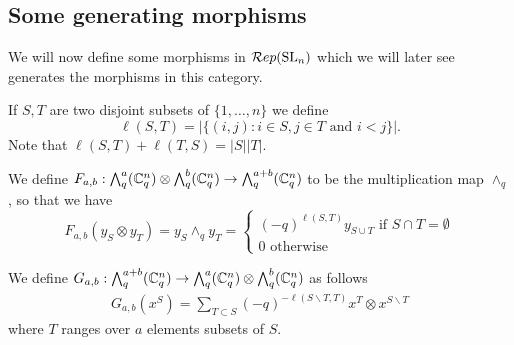 \documentclass[11pt,leqno]{article}
\begin{document}
\subsection{Some generating morphisms}
\label{sec:generating-morphisms}
We will now define some morphisms in $ \mathcal{R}ep({\rm{SL}}_n) $ which we will later see generates the morphisms in this category.

If $ S, T $ are two disjoint subsets of $ \{1, \dots, n\} $ we define $$ \ell(S, T) = |\{ (i,j) : i \in S, j \in T \text{ and } i < j \}|. $$ Note that $\ell(S,T) + \ell(T,S) = |S||T| $.

We define $ F_{a,b} : \bigwedge^a_q ({\mathbb{C}}^n_q) \otimes \bigwedge^b_q({\mathbb{C}}^n_q) \rightarrow \bigwedge^{a+b}_q({\mathbb{C}}^n_q) $ to be the 
multiplication map $ \wedge_q $, so that we have
\begin{equation*}
F_{a,b}(y_S \otimes y_T) = y_S \wedge_q y_T = \begin{cases} (-q)^{\ell(S, T)} y_{S \cup T} \text{ if $S \cap T = \emptyset$} \\
 0 \text{ otherwise}
 \end{cases} 
\end{equation*}

We define $ G_{a,b} :\bigwedge^{a+b}_q({\mathbb{C}}^n_q) \rightarrow \bigwedge^a_q ({\mathbb{C}}^n_q) \otimes \bigwedge^b_q({\mathbb{C}}^n_q) $ as follows 
\begin{align*}
G_{a,b}(x^S) = \sum_{T \subset S} (-q)^{-\ell(S \smallsetminus T, T)} x^T \otimes x^{S \smallsetminus T}
\end{align*}
where $ T $ ranges over $ a $ elements subsets of $ S $.



\end{document}
